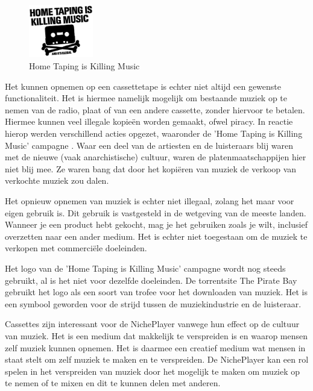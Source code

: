 \begin{figure}
    \centering
    \includegraphics[width=0.25\textwidth]{assets/critical-review/Home_taping_is_killing_music.png}
    \caption{Home Taping is Killing Music}
    \label{fig:critical-review:home_taping_is_killing_music}
\end{figure}
Het kunnen opnemen op een cassettetape is echter niet altijd een gewenste functionaliteit. Het is hiermee namelijk mogelijk om bestaande muziek op te nemen van de radio, plaat of van een andere cassette, zonder hiervoor te betalen. Hiermee kunnen veel illegale kopieën worden gemaakt, ofwel piracy. In reactie hierop werden verschillend acties opgezet, waaronder de 'Home Taping is Killing Music' campagne \cite{bottomley2015home}. Waar een deel van de artiesten en de luisteraars blij waren met de nieuwe (vaak anarchistische) cultuur, waren de platenmaatschappijen hier niet blij mee. Ze waren bang dat door het kopiëren van muziek de verkoop van verkochte muziek zou dalen.

Het opnieuw opnemen van muziek is echter niet illegaal, zolang het maar voor eigen gebruik is. Dit gebruik is vastgesteld in de wetgeving van de meeste landen. Wanneer je een product hebt gekocht, mag je het gebruiken zoals je wilt, inclusief overzetten naar een ander medium. Het is echter niet toegestaan om de muziek te verkopen met commerciële doeleinden. 

Het logo van de 'Home Taping is Killing Music' campagne wordt nog steeds gebruikt, al is het niet voor dezelfde doeleinden. De torrentsite The Pirate Bay gebruikt het logo als een soort van trofee voor het downloaden van muziek. Het is een symbool geworden voor de strijd tussen de muziekindustrie en de luisteraar.

Cassettes zijn interessant voor de NichePlayer vanwege hun effect op de cultuur van muziek. Het is een medium dat makkelijk te verspreiden is en waarop mensen zelf muziek kunnen opnemen. Het is daarmee een creatief medium wat mensen in staat stelt om zelf muziek te maken en te verspreiden. De NichePlayer kan een rol spelen in het verspreiden van muziek door het mogelijk te maken om muziek op te nemen of te mixen en dit te kunnen delen met anderen.

